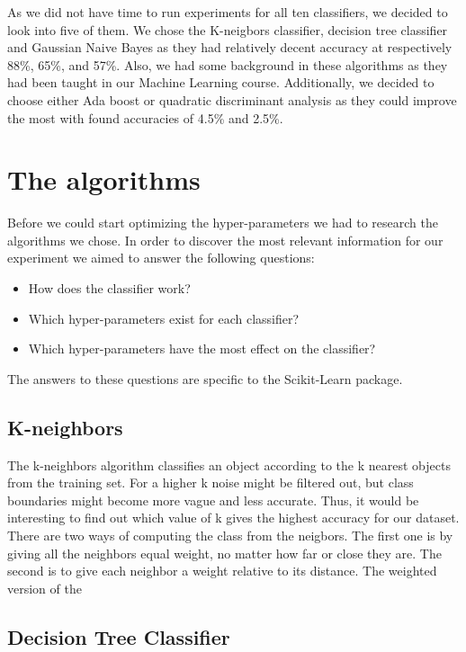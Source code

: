 \documentclass{article}
\begin{document}
	As we did not have time to run experiments for all ten classifiers, we decided to look into five of them. We chose the K-neigbors classifier, decision tree classifier and Gaussian Naive Bayes as they had relatively decent accuracy at respectively 88\%, 65\%, and 57\%. Also, we had some background in these algorithms as they had been taught in our Machine Learning course. Additionally, we decided to choose either Ada boost or quadratic discriminant analysis as they could improve the most with found accuracies of 4.5\% and 2.5\%. 

\newpage
\section{The algorithms}
	Before we could start optimizing the hyper-parameters we had to research the algorithms we chose. In order to discover the most relevant information for our experiment we aimed to answer the following questions:
	
	\begin{itemize}
		\item How does the classifier work? 
		\item Which hyper-parameters exist for each classifier?
		\item Which hyper-parameters have the most effect on the classifier?
	\end{itemize}
	
	The answers to these questions are specific to the Scikit-Learn package.
	
	\subsection{K-neighbors}
		The k-neighbors algorithm classifies an object according to the k nearest objects from the training set. For a higher k noise might be filtered out, but class boundaries might become more vague and less accurate. Thus, it would be interesting to find out which value of k gives the highest accuracy for our dataset. There are two ways of computing the class from the neigbors. The first one is by giving all the neighbors equal weight, no matter how far or close they are.  The second is to give each neighbor a weight relative to its distance. The weighted version of the 
	
	\subsection{Decision Tree Classifier}
	
\end{document}
